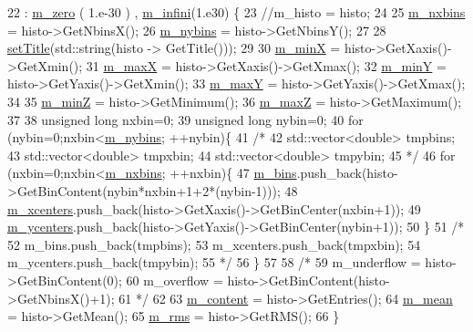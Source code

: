 \begin{DoxyCode}
22                               : \hyperlink{classHisto2D_a71dfc840fbaa159ef22091312d1ae5d9}{m\_zero} ( 1.e-30 ) , \hyperlink{classHisto2D_a3763bdf81d08ba44aa56c0e85de95ff3}{m\_infini}(1.e30) \{
23   \textcolor{comment}{//m\_histo = histo; }
24   
25   \hyperlink{classHisto2D_a39a9d29010bf81c546a1ad1b01f7cb43}{m\_nxbins} = histo->GetNbinsX();
26   \hyperlink{classHisto2D_afebeb164369fa9cea59f226d71907e3d}{m\_nybins} = histo->GetNbinsY();
27 
28   \hyperlink{classObject_a89557dbbad5bcaa02652f5d7fa35d20f}{setTitle}(std::string(histo -> GetTitle()));
29   
30   \hyperlink{classHisto2D_a039d7f45ec8b5b84c1d71f8f87884211}{m\_minX} = histo->GetXaxis()->GetXmin();
31   \hyperlink{classHisto2D_af428efc9b984006eeba1a216f7d15d6d}{m\_maxX} = histo->GetXaxis()->GetXmax();
32   \hyperlink{classHisto2D_a5bea9523f4ac077b0cc72cc1b28e0834}{m\_minY} = histo->GetYaxis()->GetXmin();
33   \hyperlink{classHisto2D_a049044e82d008636040c5c8815cac297}{m\_maxY} = histo->GetYaxis()->GetXmax();
34 
35   \hyperlink{classHisto2D_a6cfa2290ee0d786b37f7ed08129c60e3}{m\_minZ} = histo->GetMinimum();
36   \hyperlink{classHisto2D_a82422535a6aeaf911129c91e0e44e603}{m\_maxZ} = histo->GetMaximum();
37 
38   \textcolor{keywordtype}{unsigned} \textcolor{keywordtype}{long} nxbin=0;
39   \textcolor{keywordtype}{unsigned} \textcolor{keywordtype}{long} nybin=0;
40   \textcolor{keywordflow}{for} (nybin=0;nxbin<\hyperlink{classHisto2D_afebeb164369fa9cea59f226d71907e3d}{m\_nybins}; ++nybin)\{
41     \textcolor{comment}{/*}
42 \textcolor{comment}{      std::vector<double> tmpbins;
}
43 \textcolor{comment}{      std::vector<double> tmpxbin;
}
44 \textcolor{comment}{      std::vector<double> tmpybin;
}
45 \textcolor{comment}{    */}
46     \textcolor{keywordflow}{for} (nxbin=0;nxbin<\hyperlink{classHisto2D_a39a9d29010bf81c546a1ad1b01f7cb43}{m\_nxbins}; ++nxbin)\{
47       \hyperlink{classHisto2D_a84f6c03673499f34b981cdebf69d22aa}{m\_bins}.push\_back(histo->GetBinContent(nybin*nxbin+1+2*(nybin-1)));
48       \hyperlink{classHisto2D_aa2e8211f89d086e1c0beaf3b7d18c568}{m\_xcenters}.push\_back(histo->GetXaxis()->GetBinCenter(nxbin+1));
49       \hyperlink{classHisto2D_a2a431c0f22a038482fc8b3913743f08b}{m\_ycenters}.push\_back(histo->GetYaxis()->GetBinCenter(nybin+1));
50     \}
51     \textcolor{comment}{/*}
52 \textcolor{comment}{      m\_bins.push\_back(tmpbins);
}
53 \textcolor{comment}{      m\_xcenters.push\_back(tmpxbin);
}
54 \textcolor{comment}{      m\_ycenters.push\_back(tmpybin);    
}
55 \textcolor{comment}{    */}
56   \}
57   
58   \textcolor{comment}{/*  
}
59 \textcolor{comment}{  m\_underflow = histo->GetBinContent(0);
}
60 \textcolor{comment}{  m\_overflow = histo->GetBinContent(histo->GetNbinsX()+1);  
}
61 \textcolor{comment}{  */}
62 
63   \hyperlink{classHisto2D_ab70be93148e5c9b24e48b60c6b3b5f89}{m\_content} = histo->GetEntries();
64   \hyperlink{classHisto2D_a78286e1d11cc657a5fd1bd1f60c8dff9}{m\_mean}    = histo->GetMean();
65   \hyperlink{classHisto2D_a461938b95bb93a810ae7941a181023cc}{m\_rms}     = histo->GetRMS();
66 \}
\end{DoxyCode}
\mbox{\label{classHisto2D_a4df8112579be6bc1d5652933c73125ae}} 
